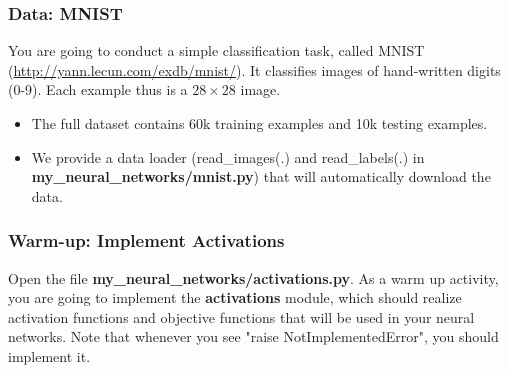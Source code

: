 \documentclass{article}
\begin{document}
\subsubsection*{Data: MNIST}

You are going to conduct a simple classification task, called MNIST (\url{http://yann.lecun.com/exdb/mnist/}). It classifies images of hand-written digits (0-9). Each example thus is a \(28 \times 28\) image. 
\begin{itemize}
\item The full dataset contains 60k training examples and 10k testing examples.
\item We provide a data loader (read\_images(.) and read\_labels(.) in \textbf{my\_neural\_networks/mnist.py}) that will automatically download the data.
\end{itemize}


\subsubsection*{\bf Warm-up: Implement Activations}

\noindent Open the file \textbf{my\_neural\_networks/activations.py}.
As a warm up activity, you are going to implement the
\textbf{activations} module, which should realize activation functions and
objective functions that will be used in your neural networks. Note that whenever you see "raise NotImplementedError", you should implement it.
\end{document}
